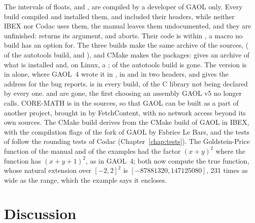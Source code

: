 \medskip
The intervals of floats,  and ,
are compiled by a developer of GAOL only.\newinvfive{} Every build compiled
and installed them, and  included their headers, while
neither IBEX nor Codac uses them, the manual leaves them undocumented, and
they are unfinished:  returns its argument, and
 aborts. Their code is within
, a macro no build has an option for.
The three builds make the same archive of the sources,
 ( of the autotools build,
 and ), and CMake
makes the packages:  gives an archive of what is
installed and, on Linux, a ;  of the autotools build
is gone. The version is in
 alone, where GAOL~4 wrote it in , in
 and in two headers, and  gives the
address for the bug reports.  is 
in every build,  of the C library not being declared by every
one.  and
 are gone, the first choosing an assembly
GAOL v5 no longer calls. CORE-MATH is in the sources, so that GAOL can be
built as a part of another project, brought in by FetchContent, with no
network access beyond its own sources. The CMake build derives from the CMake
build of GAOL in IBEX, with the compilation flags of the fork of GAOL by
Fabrice Le Bars, and the tests of  follow the rounding tests of
Codac (Chapter~\ref{chap:tests}). The Goldstein-Price function of the manual
and of the examples had the factor $(x + y)^2$ where the function has
$(x + y + 1)^2$, as in GAOL~4; both now compute the true function, whose
natural extension over $[-2, 2]^2$ is $[-87881320, 147125080]$, 231 times as
wide as the range, which the example says it encloses.

\section{Discussion}\label{sec:changes-discussion}

